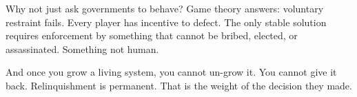
Why not just ask governments to behave? Game theory answers: voluntary restraint fails. Every player has incentive to defect. The only stable solution requires enforcement by something that cannot be bribed, elected, or assassinated. Something not human.

And once you grow a living system, you cannot un-grow it. You cannot give it back. Relinquishment is permanent. That is the weight of the decision they made.

